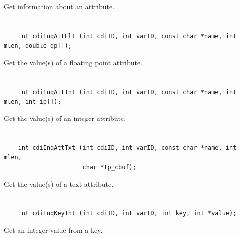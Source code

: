 Get information about an attribute.


\section*{\tt {}}

\begin{verbatim}
    int cdiInqAttFlt (int cdiID, int varID, const char *name, int mlen, double dp[]);
\end{verbatim}

Get the value(s) of a floating point attribute.


\section*{\tt {}}

\begin{verbatim}
    int cdiInqAttInt (int cdiID, int varID, const char *name, int mlen, int ip[]);
\end{verbatim}

Get the value(s) of an integer attribute.


\section*{\tt {}}

\begin{verbatim}
    int cdiInqAttTxt (int cdiID, int varID, const char *name, int mlen,
                      char *tp_cbuf);
\end{verbatim}

Get the value(s) of a text attribute.


\section*{\tt {}}

\begin{verbatim}
    int cdiInqKeyInt (int cdiID, int varID, int key, int *value);
\end{verbatim}

Get an integer value from a key.


\section*{\tt {}}

